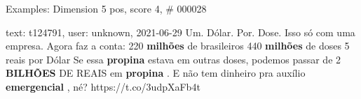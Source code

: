 \begin{frame}{Examples: Dimension 5 pos, score 4, \# 000028}
\footnotesize
\begin{exampleblock}{text: t124791, user: unknown, 2021-06-29}
Um. Dólar. Por. Dose. Isso só com uma empresa. Agora faz a conta: 220 
\textbf{milhões} de brasileiros 440 \textbf{milhões} de doses 5 reais por Dólar 
Se essa \textbf{propina} estava em outras doses, podemos passar de 2 
\textbf{BILHÕES} DE REAIS em \textbf{propina} . E não tem dinheiro pra auxílio 
\textbf{emergencial} , né? https://t.co/3udpXaFb4t 
\end{exampleblock}
\end{frame}
